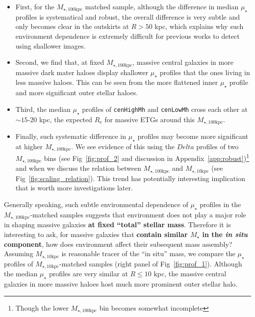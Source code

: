 \documentclass[a4paper,fleqn,usenatbib]{mnras}
\def\rbcg{\texttt{cenHighMh}}
\def\nbcg{\texttt{cenLowMh}}
\def\mstar{{$M_{\star}$}}
\def\minn{{$M_{\star,10\mathrm{kpc}}$}}
\def\mtot{{$M_{\star,100\mathrm{kpc}}$}}
\def\mden{{$\mu_{\star}$}}
\begin{document}
    \begin{itemize}
        
        \item First, for the \mtot{} matched sample, although the difference in 
            median \mden{} profiles is systematical and robust, the overall difference 
            is very subtle and only becomes clear in the outskirts at $R>50$ kpc, 
            which explains why such environment dependence is extremely difficult 
            for previous works to detect using shallower images.
            
        \item Second, we find that, at fixed \mtot{}, massive central galaxies in 
            more massive dark mater haloes display shallower \mden{} profiles that the 
            ones living in less massive haloes. 
            This can be seen from the more flattened inner \mden{} profile and more 
            significant outer stellar haloes.
        
        \item Third, the median \mden{} profiles of \rbcg{} and \nbcg{} cross each 
            other at ${\sim} 15$-20 kpc, the expected $R_{\mathrm{e}}$ for massive 
            ETGs around this \mtot{}. 
        
        \item Finally, such systematic difference in \mden{} profiles may become more 
            significant at higher \mtot{}.
            We see evidence of this using the $Delta$ profiles of two \mtot{} 
            bins (see Fig~\ref{fig:prof_2} and discussion in 
            Appendix~\ref{app:robust})\footnote{Though the lower \mtot{} bin becomes 
            somewhat incomplete} and when we discuss the relation between \mtot{} and 
            \minn{} (see Fig~\ref{fig:scaling_relation}). 
            This trend has potentially interesting implication that is worth more 
            investigations later.  
            
    \end{itemize}

    Generally speaking, such subtle environmental dependence of \mden{} profiles in 
    the \mtot{}-matched samples suggests that environment does not play a major role 
    in shaping massive galaxies \textbf{at fixed ``total'' stellar mass}.
    Therefore it is interesting to ask, for massive galaxies that \textbf{contain 
    similar \mstar{} in the \textit{in situ} component}, how does environment affect 
    their subsequent mass assembly?
    Assuming \minn{} is reasonable tracer of the ``in situ'' mass, we compare the 
    \mden{} profiles of \minn{}-matched samples (right panel of Fig~\ref{fig:prof_1}).  
    Although the median \mden{} profiles are very similar at $R \leq 10$ kpc, the
    massive central galaxies in more massive haloes host much more prominent outer 
    stellar halo. 
    
\end{document}
